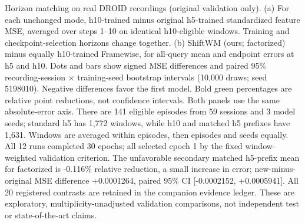 Horizon matching on real DROID recordings (original validation only). (a) For each unchanged mode, h10-trained minus original h5-trained standardized feature MSE, averaged over steps 1--10 on identical h10-eligible windows. Training and checkpoint-selection horizons change together. (b) ShiftWM (ours; factorized) minus equally h10-trained Framewise, for all-query mean and endpoint errors at h5 and h10. Dots and bars show signed MSE differences and paired 95\% recording-session $\times$ training-seed bootstrap intervals (10,000 draws; seed 5198010). Negative differences favor the first model. Bold green percentages are relative point reductions, not confidence intervals. Both panels use the same absolute-error axis. There are 141 eligible episodes from 59 sessions and 3 model seeds; standard h5 has 1,772 windows, while h10 and matched h5 prefixes have 1,631. Windows are averaged within episodes, then episodes and seeds equally. All 12 runs completed 30 epochs; all selected epoch 1 by the fixed window-weighted validation criterion. The unfavorable secondary matched h5-prefix mean for factorized is -0.116\% relative reduction, a small increase in error; new-minus-original MSE difference +0.0001264, paired 95\% CI [-0.0002152, +0.0005941]. All 20 registered contrasts are retained in the companion evidence ledger. These are exploratory, multiplicity-unadjusted validation comparisons, not independent test or state-of-the-art claims.
